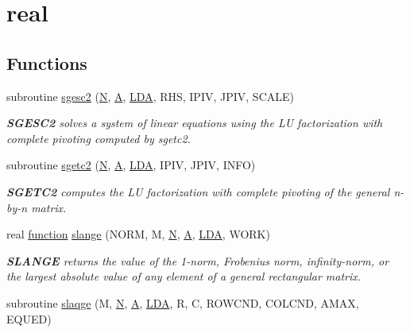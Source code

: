 \hypertarget{group__realGEauxiliary}{}\section{real}
\label{group__realGEauxiliary}
\subsection*{Functions}
\begin{DoxyCompactItemize}
\item 
subroutine \hyperlink{group__realGEauxiliary_ga8ad3f90608eb3f7cc3ea700ea36b8fdc}{sgesc2} (\hyperlink{polmisc_8c_a0240ac851181b84ac374872dc5434ee4}{N}, \hyperlink{classA}{A}, \hyperlink{example__user_8c_ae946da542ce0db94dced19b2ecefd1aa}{L\+D\+A}, R\+H\+S, I\+P\+I\+V, J\+P\+I\+V, S\+C\+A\+L\+E)
\begin{DoxyCompactList}\small\item\em {\bfseries S\+G\+E\+S\+C2} solves a system of linear equations using the L\+U factorization with complete pivoting computed by sgetc2. \end{DoxyCompactList}\item 
subroutine \hyperlink{group__realGEauxiliary_gac0fa1757e981d8faef063cc9f4fa09ea}{sgetc2} (\hyperlink{polmisc_8c_a0240ac851181b84ac374872dc5434ee4}{N}, \hyperlink{classA}{A}, \hyperlink{example__user_8c_ae946da542ce0db94dced19b2ecefd1aa}{L\+D\+A}, I\+P\+I\+V, J\+P\+I\+V, I\+N\+F\+O)
\begin{DoxyCompactList}\small\item\em {\bfseries S\+G\+E\+T\+C2} computes the L\+U factorization with complete pivoting of the general n-\/by-\/n matrix. \end{DoxyCompactList}\item 
real \hyperlink{afunc_8m_a7b5e596df91eadea6c537c0825e894a7}{function} \hyperlink{group__realGEauxiliary_ga459d27829607393670ef7de8a6914933}{slange} (N\+O\+R\+M, M, \hyperlink{polmisc_8c_a0240ac851181b84ac374872dc5434ee4}{N}, \hyperlink{classA}{A}, \hyperlink{example__user_8c_ae946da542ce0db94dced19b2ecefd1aa}{L\+D\+A}, W\+O\+R\+K)
\begin{DoxyCompactList}\small\item\em {\bfseries S\+L\+A\+N\+G\+E} returns the value of the 1-\/norm, Frobenius norm, infinity-\/norm, or the largest absolute value of any element of a general rectangular matrix. \end{DoxyCompactList}\item 
subroutine \hyperlink{group__realGEauxiliary_gabaa3db78f4dbf32f2513725d6ec253b5}{slaqge} (M, \hyperlink{polmisc_8c_a0240ac851181b84ac374872dc5434ee4}{N}, \hyperlink{classA}{A}, \hyperlink{example__user_8c_ae946da542ce0db94dced19b2ecefd1aa}{L\+D\+A}, R, C, R\+O\+W\+C\+N\+D, C\+O\+L\+C\+N\+D, A\+M\+A\+X, E\+Q\+U\+E\+D)

\end{DoxyCompactItemize}
